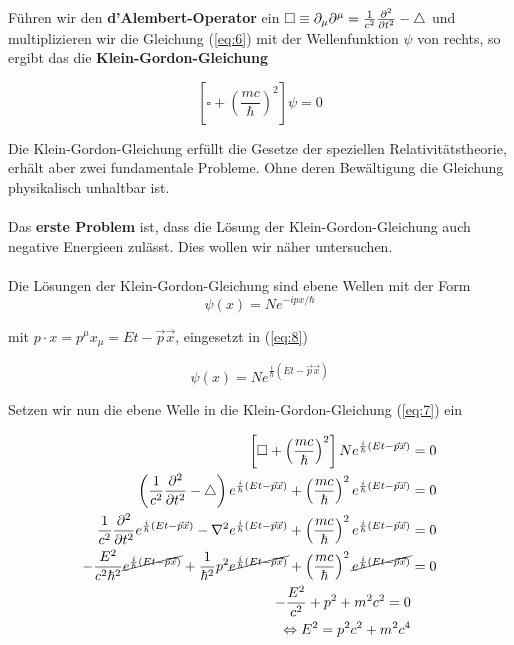 Führen wir den \textbf{d'Alembert-Operator} ein \(\square \equiv \partial_\mu\partial^\mu = \frac{1}{c^2}\pdiff^2_t - \triangle \) und multiplizieren wir die Gleichung (\ref{eq:6}) mit der Wellenfunktion \(\psi\) von rechts, so ergibt das die \textbf{Klein-Gordon-Gleichung}

\begin{equation}
  \label{eq:7}
 \boxed{\left[  \square + \left(\frac{mc}{\hbar}\right)^2\right]\psi  = 0 }
\end{equation}


Die Klein-Gordon-Gleichung erfüllt die Gesetze der speziellen Relativitätstheorie, erhält aber zwei fundamentale Probleme. Ohne deren Bewältigung die Gleichung physikalisch unhaltbar ist. \\
\\
Das \textbf{erste Problem} ist, dass die Lösung der Klein-Gordon-Gleichung auch negative Energieen zulässt. Dies wollen wir näher untersuchen.\\
\\
Die Lösungen der  Klein-Gordon-Gleichung sind ebene Wellen mit der Form
\begin{equation}
  \label{eq:8}
\psi(x) = Ne^{-ipx/\hbar}  
\end{equation}

mit \(p\cdot x = p^\mu x_\mu = Et - \vec p\vec x\), eingesetzt in (\ref{eq:8})

\begin{equation}
  \label{eq:9}
  \psi(x) = Ne^{\frac{i}{\hbar}(Et - \vec p\vec x)}
\end{equation}

Setzen wir nun die ebene Welle in die Klein-Gordon-Gleichung (\ref{eq:7})  ein

\begin{align}
  \label{eq:10}
  \left[  \square + \left(\frac{mc}{\hbar}\right)^2\right] Ne^{\frac{i}{\hbar}(Et - \vec p\vec x)}   &= 0 \\
  \left(\frac{1}{c^2}\pdiff^2_t - \triangle \right) e^{\frac{i}{\hbar}(Et - \vec p\vec x)}  + \left(\frac{mc}{\hbar}\right)^2e^{\frac{i}{\hbar}(Et - \vec p\vec x)}   &= 0 \\
 \frac{1}{c^2}\pdiff^2_t e^{\frac{i}{\hbar}(Et - \vec p\vec x)}  - \nabla^2  e^{\frac{i}{\hbar}(Et - \vec p\vec x)}  + \left(\frac{mc}{\hbar}\right)^2e^{\frac{i}{\hbar}(Et - \vec p\vec x)}   &= 0 \\
 -\frac{E^2}{c^2\hbar^2} \cancel{ e^{\frac{i}{\hbar}(Et - \vec p\vec x)}}  +\frac{1}{\hbar^2}  p^2\cancel{ e^{\frac{i}{\hbar}(Et - \vec p\vec x)}}  + \left(\frac{mc}{\hbar}\right)^2 \cancel{ e^{\frac{i}{\hbar}(Et - \vec p\vec x)}}   &= 0 \\
 -\frac{E^2}{c^2} +  p^2  + m^2c^2 = 0 \\
\Leftrightarrow  E^2 =  p^2c^2  + m^2c^4
\end{align}


